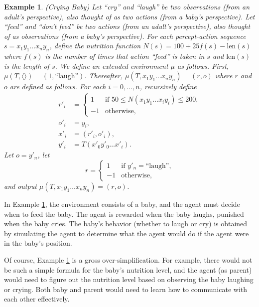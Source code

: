 \documentclass{article}
\newtheorem{myexample}[mytheorem]{Example}
\begin{document}
\begin{myexample}
\label{cryingbabyexample}
  (Crying Baby)
  Let ``cry'' and ``laugh'' be two observations (from an adult's perspective),
  also thought of as two actions (from a baby's perspective).
  Let ``feed'' and ``don't feed'' be two actions (from an adult's perspective),
  also thought of as observations (from a baby's perspective).
  For each percept-action sequence $s=x_1y_1\ldots x_ny_n$, define the
  nutrition function $N(s)=100+25f(s)-\mbox{len}(s)$ where $f(s)$ is the number
  of times that action ``feed'' is taken in $s$ and $\mbox{len}(s)$ is the length of $s$.
  We define an extended environment $\mu$ as follows.
  First, $\mu(T,\langle\rangle)=(1,\mbox{``laugh''})$.
  Thereafter, $\mu(T,x_1y_1\ldots x_ny_n)=(r,o)$ where $r$ and $o$ are defined as follows.
  For each $i=0,\ldots,n$, recursively define
  \begin{align*}
    r'_i &=
      \begin{cases}
        1 & \mbox{if $50 \leq N(x_1y_1\ldots x_iy_i)\leq 200$,}\\
        -1 & \mbox{otherwise,}
      \end{cases}\\
    o'_i &= y_i,\\
    x'_i &= (r'_i,o'_i),\\
    y'_i &= T(x'_0y'_0 \ldots x'_i).
  \end{align*}
  Let $o=y'_n$, let
  \[
    r=
      \begin{cases}
        1 & \mbox{if $y'_n=\mbox{``laugh''}$,}\\
        -1 & \mbox{otherwise,}
      \end{cases}
  \]
  and output $\mu(T,x_1y_1\ldots x_ny_n)=(r,o)$.
\end{myexample}

In Example \ref{cryingbabyexample}, the environment consists of a baby, and the
agent must decide when to feed the baby. The agent is rewarded when the baby laughs,
punished when the baby cries. The baby's behavior (whether to laugh or cry) is obtained
by simulating the agent to determine what the agent would do if the agent were in the
baby's position.

Of course, Example \ref{cryingbabyexample} is a gross
over-simplification. For example, there would not be such a simple formula for the
baby's nutrition level, and the agent (as parent) would need to figure out the nutrition level
based on observing the baby laughing or crying. Both baby and parent would need to
learn how to communicate with each other effectively.
\end{document}
